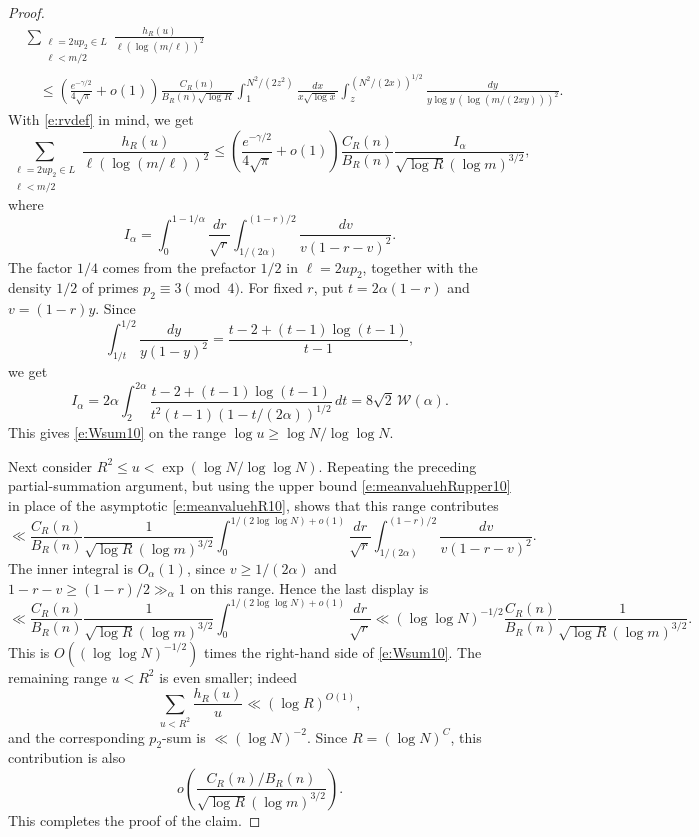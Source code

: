 \documentclass[12pt,reqno]{amsart}
\numberwithin{equation}{section}
\theoremstyle{definition}
\theoremstyle{remark}
\begin{document}
\begin{proof}
\begin{align*}
 &\sum_{\substack{\ell=2up_2\in L\\ \ell<m/2}}
 \frac{h_R(u)}{\ell(\log(m/\ell))^2}\\
 &\quad\leq
 \left(\frac{e^{-\gamma/2}}{4\sqrt\pi}+o(1)\right)
 \frac{C_R(n)}{B_R(n)\sqrt{\log R}}
 \int_1^{N^2/(2z^2)}
 \frac{dx}{x\sqrt{\log x}}
 \int_z^{(N^2/(2x))^{1/2}}
 \frac{dy}
 {y\log y\,(\log(m/(2xy)))^2}.
\end{align*}
With \eqref{e:rvdef} in mind, 
we get
\[
 \sum_{\substack{\ell=2up_2\in L\\ \ell<m/2}}
 \frac{h_R(u)}{\ell(\log(m/\ell))^2} \leq \left(\frac{e^{-\gamma/2}}{4\sqrt\pi}+o(1)\right)
 \frac{C_R(n)}{B_R(n)}
 \frac{I_\alpha}
 {\sqrt{\log R}(\log m)^{3/2}},
\]
where
\[
 I_\alpha=
 \int_0^{1-1/\alpha}\frac{dr}{\sqrt r}
 \int_{1/(2\alpha)}^{(1-r)/2}
 \frac{dv}{v(1-r-v)^2}.
\]
The factor \(1/4\) comes from the prefactor \(1/2\) in
\(\ell=2up_2\), together with the density \(1/2\) of primes
\(p_2\equiv3\pmod4\). For fixed \(r\), put
\(t=2\alpha(1-r)\) and \(v=(1-r)y\).  Since
\[
 \int_{1/t}^{1/2}\frac{dy}{y(1-y)^2}
 =
 \frac{t-2+(t-1)\log(t-1)}{t-1},
\]
we get
\[
 I_\alpha
 =
 2\alpha\int_2^{2\alpha}
 \frac{t-2+(t-1)\log(t-1)}
 {t^2(t-1)(1-t/(2\alpha))^{1/2}}\,dt
 =
 8\sqrt2\,\mathcal W(\alpha).
\]
This gives \eqref{e:Wsum10} on the range
\(\log u\geq\log N/\log\log N\).

Next consider \(R^2\leq u<\exp(\log N/\log\log N)\).  Repeating the
preceding partial-summation argument, but using the upper bound
\eqref{e:meanvaluehRupper10} in place of the asymptotic
\eqref{e:meanvaluehR10}, shows that this range contributes
\[
 \ll
 \frac{C_R(n)}{B_R(n)}
 \frac1{\sqrt{\log R}(\log m)^{3/2}}
 \int_0^{1/(2\log\log N)+o(1)}
 \frac{dr}{\sqrt r}
 \int_{1/(2\alpha)}^{(1-r)/2}
 \frac{dv}{v(1-r-v)^2}.
\]
The inner integral is \(O_\alpha(1)\), since \(v\geq1/(2\alpha)\) and
\(1-r-v\geq(1-r)/2\gg_\alpha1\) on this range.  Hence the last display is
\[
 \ll
 \frac{C_R(n)}{B_R(n)}
 \frac1{\sqrt{\log R}(\log m)^{3/2}}
 \int_0^{1/(2\log\log N)+o(1)}
 \frac{dr}{\sqrt r}
 \ll
 (\log\log N)^{-1/2}
 \frac{C_R(n)}{B_R(n)}
 \frac1{\sqrt{\log R}(\log m)^{3/2}}.
\]
This is \(O((\log\log N)^{-1/2})\) times the right-hand side of
\eqref{e:Wsum10}.  The remaining range \(u<R^2\) is even smaller; indeed
\[
 \sum_{u<R^2}\frac{h_R(u)}u\ll(\log R)^{O(1)},
\]
and the corresponding \(p_2\)-sum is \(\ll(\log N)^{-2}\).  Since
\(R=(\log N)^C\), this contribution is also
\[
 o\left(\frac{C_R(n)/B_R(n)}
 {\sqrt{\log R}(\log m)^{3/2}}\right).
\]
This completes the proof of the claim.


\end{proof}
\end{document}
